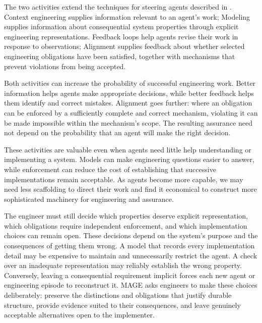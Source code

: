 The two activities extend the techniques for steering agents described in \href{1.4-the-agentic-substrate.html}{}. Context engineering supplies information relevant to an agent's work; Modeling supplies information about consequential system properties through explicit engineering representations. Feedback loops help agents revise their work in response to observations; Alignment supplies feedback about whether selected engineering obligations have been satisfied, together with mechanisms that prevent violations from being accepted.

Both activities can increase the probability of successful engineering work. Better information helps agents make appropriate decisions, while better feedback helps them identify and correct mistakes. Alignment goes further: where an obligation can be enforced by a sufficiently complete and correct mechanism, violating it can be made impossible within the mechanism's scope. The resulting assurance need not depend on the probability that an agent will make the right decision.

These activities are valuable even when agents need little help understanding or implementing a system. Models can make engineering questions easier to answer, while enforcement can reduce the cost of establishing that successive implementations remain acceptable. As agents become more capable, we may need less scaffolding to direct their work and find it economical to construct more sophisticated machinery for engineering and assurance.

The engineer must still decide which properties deserve explicit representation, which obligations require independent enforcement, and which implementation choices can remain open. These decisions depend on the system's purpose and the consequences of getting them wrong. A model that records every implementation detail may be expensive to maintain and unnecessarily restrict the agent. A check over an inadequate representation may reliably establish the wrong property. Conversely, leaving a consequential requirement implicit forces each new agent or engineering episode to reconstruct it. MAGE asks engineers to make these choices deliberately: preserve the distinctions and obligations that justify durable structure, provide evidence suited to their consequences, and leave genuinely acceptable alternatives open to the implementer.


